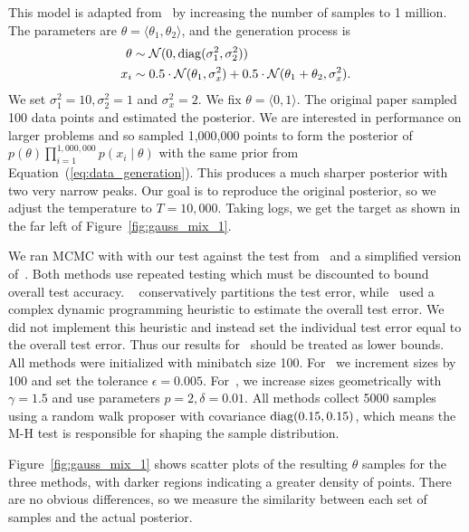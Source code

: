 \documentclass[twoside]{article} \usepackage{aistats2017}
\begin{document}
This model is adapted from~\citet{langevin_2011} by increasing the number
of samples to 1 million.  The parameters are $\theta = \langle \theta_1,\theta_2 \rangle$, and the
generation process is
\begin{equation}\label{eq:data_generation}
\begin{split}
    \theta &\sim \mathcal{N}(0, {\rm diag}(\sigma_1^2,\sigma_2^2)) \\
    x_i & \sim 0.5 \cdot \mathcal{N}(\theta_1, \sigma_x^2) + 0.5 \cdot \mathcal{N}(\theta_1+\theta_2, \sigma_x^2).
\end{split}
\end{equation}
We set $\sigma_1^2 = 10, \sigma_2^2 = 1$ and $\sigma_x^2=2$.  We fix $\theta =
\langle 0,1 \rangle$. The original paper sampled 100 data points and estimated
the posterior. We are interested in performance on larger problems and so
sampled 1,000,000 points to form the posterior of
$p(\theta)\prod_{i=1}^{1,000,000}p(x_i\mid \theta)$ with the same prior from
Equation~(\ref{eq:data_generation}). This produces a much sharper posterior with
two very narrow peaks.  Our goal is to reproduce the original posterior, so we
adjust the temperature to $T=10,000$.  Taking logs, we get the target as shown
in the far left of Figure~\ref{fig:gauss_mix_1}.

We ran MCMC with with our test against the test
from~\citet{icml2014c1_bardenet14} and a simplified version
of~\citet{cutting_mh_2014}. Both methods use repeated testing which
must be discounted to bound overall test
accuracy. ~\citet{icml2014c1_bardenet14} conservatively partitions the
test error, while~\citet{cutting_mh_2014} used a complex dynamic
programming heuristic to estimate the overall test error. We did not
implement this heuristic and instead set the individual test error
equal to the overall test error. Thus our results for~\citet{cutting_mh_2014} should be treated as lower bounds. All
methods were initialized with minibatch size 100.  For~\citet{cutting_mh_2014} we
increment sizes by 100 and set the tolerance $\epsilon=0.005$.  For~\citet{icml2014c1_bardenet14}, we increase sizes geometrically with $\gamma = 1.5$ and
use parameters $p = 2, \delta = 0.01$.  All methods collect 5000
samples using a random walk proposer with covariance ${\rm diag}(0.15,
0.15)$, which means the M-H test is responsible for shaping the sample
distribution.

Figure~\ref{fig:gauss_mix_1} shows scatter plots of the resulting $\theta$
samples for the three methods, with darker regions indicating a greater density
of points. There are no obvious differences, so we measure the similarity
between each set of samples and the actual posterior. 
\end{document}
